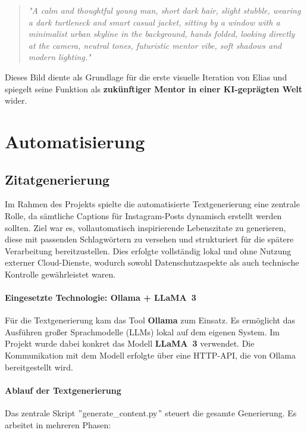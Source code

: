 \documentclass[a4paper,12pt]{article}
\begin{document}
\begin{quote}
\textit{"A calm and thoughtful young man, short dark hair, slight stubble, wearing a dark turtleneck and smart casual jacket, sitting by a window with a minimalist urban skyline in the background, hands folded, looking directly at the camera, neutral tones, futuristic mentor vibe, soft shadows and modern lighting."}
\end{quote}

Dieses Bild diente als Grundlage für die erste visuelle Iteration von Elias und spiegelt seine Funktion als \textbf{zukünftiger Mentor in einer KI-geprägten Welt} wider.


\section{Automatisierung}
\subsection{Zitatgenerierung}
Im Rahmen des Projekts spielte die automatisierte Textgenerierung eine zentrale Rolle, da sämtliche Captions für Instagram-Posts dynamisch erstellt werden sollten. Ziel war es, vollautomatisch inspirierende Lebenszitate zu generieren, diese mit passenden Schlagwörtern zu versehen und strukturiert für die spätere Verarbeitung bereitzustellen. Dies erfolgte vollständig lokal und ohne Nutzung externer Cloud-Dienste, wodurch sowohl Datenschutzaspekte als auch technische Kontrolle gewährleistet waren.

\paragraph{Eingesetzte Technologie: Ollama + LLaMA~3}

Für die Textgenerierung kam das Tool \textbf{Ollama} zum Einsatz. Es ermöglicht das Ausführen großer Sprachmodelle (LLMs) lokal auf dem eigenen System. Im Projekt wurde dabei konkret das Modell \textbf{LLaMA~3} verwendet. Die Kommunikation mit dem Modell erfolgte über eine HTTP-API, die von Ollama bereitgestellt wird.

\paragraph{Ablauf der Textgenerierung}

Das zentrale Skript \("\)generate\_content.py\("\) steuert die gesamte Generierung. Es arbeitet in mehreren Phasen:
\end{document}
